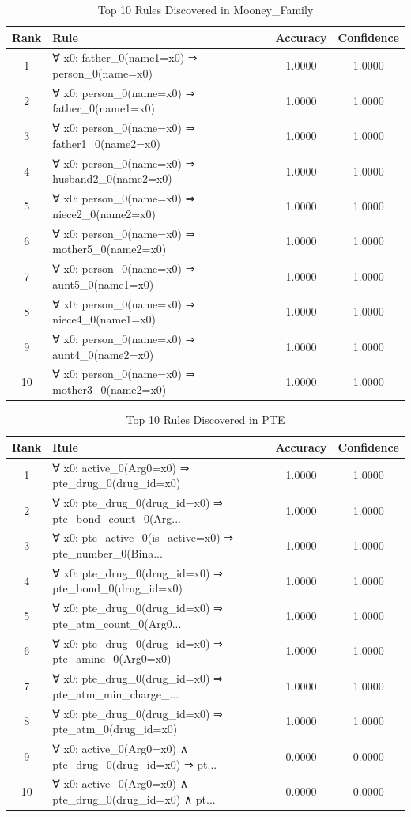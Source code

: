 \documentclass[11pt,a4paper]{article}
\begin{document}
\begin{table}[h!]
\centering
\small
\caption{Top 10 Rules Discovered in Mooney_Family}
\label{tab:rules_MooneyFamily}
\begin{tabular}{|c|p{5cm}|c|c|}
\hline
\textbf{Rank} & \textbf{Rule} & \textbf{Accuracy} & \textbf{Confidence} \\
\hline
1 & ∀ x0: father\_0(name1=x0) ⇒ person\_0(name=x0) & 1.0000 & 1.0000 \\
2 & ∀ x0: person\_0(name=x0) ⇒ father\_0(name1=x0) & 1.0000 & 1.0000 \\
3 & ∀ x0: person\_0(name=x0) ⇒ father1\_0(name2=x0) & 1.0000 & 1.0000 \\
4 & ∀ x0: person\_0(name=x0) ⇒ husband2\_0(name2=x0) & 1.0000 & 1.0000 \\
5 & ∀ x0: person\_0(name=x0) ⇒ niece2\_0(name2=x0) & 1.0000 & 1.0000 \\
6 & ∀ x0: person\_0(name=x0) ⇒ mother5\_0(name2=x0) & 1.0000 & 1.0000 \\
7 & ∀ x0: person\_0(name=x0) ⇒ aunt5\_0(name1=x0) & 1.0000 & 1.0000 \\
8 & ∀ x0: person\_0(name=x0) ⇒ niece4\_0(name1=x0) & 1.0000 & 1.0000 \\
9 & ∀ x0: person\_0(name=x0) ⇒ aunt4\_0(name2=x0) & 1.0000 & 1.0000 \\
10 & ∀ x0: person\_0(name=x0) ⇒ mother3\_0(name2=x0) & 1.0000 & 1.0000 \\
\hline
\end{tabular}
\end{table}

\begin{table}[h!]
\centering
\small
\caption{Top 10 Rules Discovered in PTE}
\label{tab:rules_PTE}
\begin{tabular}{|c|p{5cm}|c|c|}
\hline
\textbf{Rank} & \textbf{Rule} & \textbf{Accuracy} & \textbf{Confidence} \\
\hline
1 & ∀ x0: active\_0(Arg0=x0) ⇒ pte\_drug\_0(drug\_id=x0) & 1.0000 & 1.0000 \\
2 & ∀ x0: pte\_drug\_0(drug\_id=x0) ⇒ pte\_bond\_count\_0(Arg... & 1.0000 & 1.0000 \\
3 & ∀ x0: pte\_active\_0(is\_active=x0) ⇒ pte\_number\_0(Bina... & 1.0000 & 1.0000 \\
4 & ∀ x0: pte\_drug\_0(drug\_id=x0) ⇒ pte\_bond\_0(drug\_id=x0) & 1.0000 & 1.0000 \\
5 & ∀ x0: pte\_drug\_0(drug\_id=x0) ⇒ pte\_atm\_count\_0(Arg0... & 1.0000 & 1.0000 \\
6 & ∀ x0: pte\_drug\_0(drug\_id=x0) ⇒ pte\_amine\_0(Arg0=x0) & 1.0000 & 1.0000 \\
7 & ∀ x0: pte\_drug\_0(drug\_id=x0) ⇒ pte\_atm\_min\_charge\_... & 1.0000 & 1.0000 \\
8 & ∀ x0: pte\_drug\_0(drug\_id=x0) ⇒ pte\_atm\_0(drug\_id=x0) & 1.0000 & 1.0000 \\
9 & ∀ x0: active\_0(Arg0=x0) ∧ pte\_drug\_0(drug\_id=x0) ⇒ pt... & 0.0000 & 0.0000 \\
10 & ∀ x0: active\_0(Arg0=x0) ∧ pte\_drug\_0(drug\_id=x0) ∧ pt... & 0.0000 & 0.0000 \\
\hline
\end{tabular}
\end{table}
\end{document}

